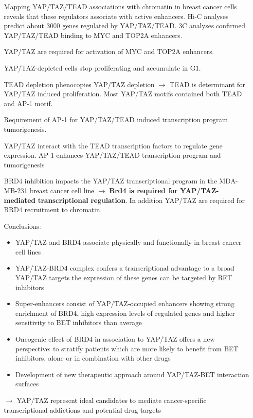 Mapping YAP/TAZ/TEAD associations with chromatin in breast cancer cells reveals that these regulators associate with active enhancers. Hi-C analyses predict about 3000 genes regulated by YAP/TAZ/TEAD. 3C analyses confirmed YAP/TAZ/TEAD binding to MYC and TOP2A enhancers.

YAP/TAZ are required for activation of MYC and TOP2A enhancers.

YAP/TAZ-depleted cells stop proliferating and accumulate in G1.

TEAD depletion phenocopies YAP/TAZ depletion $\rightarrow$ TEAD is determinant for YAP/TAZ induced proliferation. Most YAP/TAZ motifs contained both TEAD and AP-1 motif.

Requirement of AP-1 for YAP/TAZ/TEAD induced transcription program tumorigenesis.

YAP/TAZ interact with the TEAD transcription factors to regulate gene expression. AP-1 enhances YAP/TAZ/TEAD transcription program and tumorigenesis

BRD4 inhibition impacts the YAP/TAZ transcriptional program in the MDA-MB-231 breast cancer cell line $\rightarrow$ \textbf{Brd4 is required for YAP/TAZ-mediated transcriptional regulation}. In addition YAP/TAZ are required for BRD4 recruitment to chromatin.

Conclusions:

\begin{itemize}
\tightlist
\item
  YAP/TAZ and BRD4 associate physically and functionally in breast cancer cell lines
\item
  YAP/TAZ-BRD4 complex confers a transcriptional advantage to a broad YAP/TAZ targets the expression of these genes can be targeted by BET inhibitors
\item
  Super-enhancers consist of YAP/TAZ-occupied enhancers showing strong enrichment of BRD4, high expression levels of regulated genes and higher sensitivity to BET inhibitors than average
\item
  Oncogenic effect of BRD4 in association to YAP/TAZ offers a new perspective:
  to stratify patients which are more likely to benefit from BET inhibitors, alone or in combination with other drugs
\item
  Development of new therapeutic approach around YAP/TAZ-BET interaction surfaces
\end{itemize}

$\rightarrow$ YAP/TAZ represent ideal candidates to mediate cancer-specific transcriptional addictions
and potential drug targets


